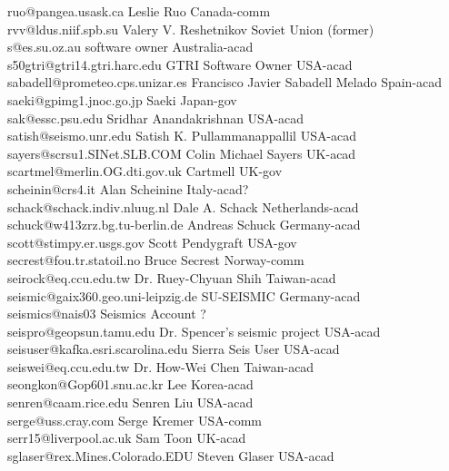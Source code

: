 \begin{tabbing}
ruo@pangea.usask.ca \> Leslie Ruo \> Canada-comm\\
rvv@ldus.niif.spb.su \> Valery V. Reshetnikov \> Soviet Union (former)\\
s@es.su.oz.au \> software owner \> Australia-acad\\
s50gtri@gtri14.gtri.harc.edu \> GTRI Software Owner \> USA-acad\\
sabadell@prometeo.cps.unizar.es \> Francisco Javier Sabadell Melado \> Spain-acad\\
saeki@gpimg1.jnoc.go.jp \> Saeki \> Japan-gov\\
sak@essc.psu.edu \> Sridhar Anandakrishnan \> USA-acad\\
satish@seismo.unr.edu \> Satish K. Pullammanappallil \> USA-acad\\
sayers@scrsu1.SINet.SLB.COM \> Colin Michael Sayers \> UK-acad\\
scartmel@merlin.OG.dti.gov.uk \> Cartmell \> UK-gov\\
scheinin@crs4.it \> Alan Scheinine \>  Italy-acad?\\
schack@schack.indiv.nluug.nl \> Dale A. Schack \> Netherlands-acad\\
schuck@w413zrz.bg.tu-berlin.de \> Andreas Schuck \> Germany-acad\\
scott@stimpy.er.usgs.gov \> Scott Pendygraft \> USA-gov\\
secrest@fou.tr.statoil.no    \>   Bruce Secrest  \> Norway-comm\\
seirock@eq.ccu.edu.tw \> Dr. Ruey-Chyuan Shih \> Taiwan-acad\\
seismic@gaix360.geo.uni-leipzig.de \> SU-SEISMIC \> Germany-acad\\
seismics@nais03  \> Seismics Account \> ?\\
seispro@geopsun.tamu.edu \> Dr. Spencer's seismic project \> USA-acad\\
seisuser@kafka.esri.scarolina.edu \> Sierra Seis User \> USA-acad\\
seiswei@eq.ccu.edu.tw \> Dr. How-Wei Chen  \> Taiwan-acad  \\
seongkon@Gop601.snu.ac.kr \> Lee \> Korea-acad\\
senren@caam.rice.edu \> Senren Liu \> USA-acad\\
serge@uss.cray.com \> Serge Kremer \> USA-comm\\
serr15@liverpool.ac.uk \> Sam Toon \> UK-acad\\
sglaser@rex.Mines.Colorado.EDU \> Steven Glaser \> USA-acad\\

\end{tabbing}
